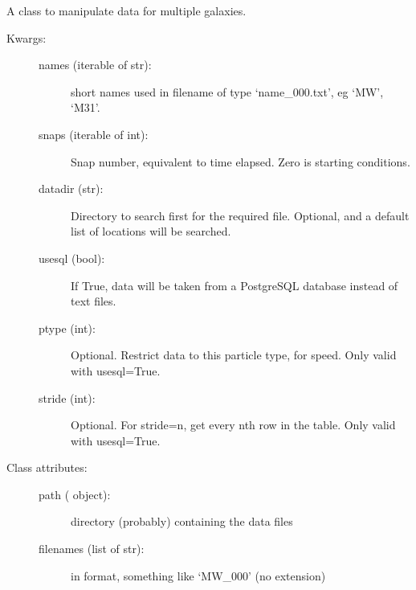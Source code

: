 \documentclass[letterpaper,10pt,english]{sphinxmanual}
\begin{document}
\begin{fulllineitems}
\label{\detokenize{galaxies:galaxy.galaxies.Galaxies}}
A class to manipulate data for multiple galaxies.
\begin{description}
\item[{Kwargs:}] \leavevmode\begin{description}
\item[{names (iterable of str):}] \leavevmode
short names used in filename of type ‘name\_000.txt’, eg ‘MW’, ‘M31’.

\item[{snaps (iterable of int):}] \leavevmode
Snap number, equivalent to time elapsed. Zero is starting conditions.

\item[{datadir (str):}] \leavevmode
Directory to search first for the required file. Optional, and a
default list of locations will be searched.

\item[{usesql (bool):}] \leavevmode
If True, data will be taken from a PostgreSQL database instead of
text files.

\item[{ptype (int):}] \leavevmode
Optional. Restrict data to this particle type, for speed. 
Only valid with usesql=True.

\item[{stride (int):}] \leavevmode
Optional. For stride=n, get every nth row in the table.
Only valid with usesql=True.

\end{description}

\item[{Class attributes:}] \leavevmode\begin{description}
\item[{path ( object):}] \leavevmode
directory (probably) containing the data files

\item[{filenames (list of str):}] \leavevmode
in  format, something like ‘MW\_000’ (no extension)


\end{description}
\end{description}
\end{fulllineitems}
\end{document}

